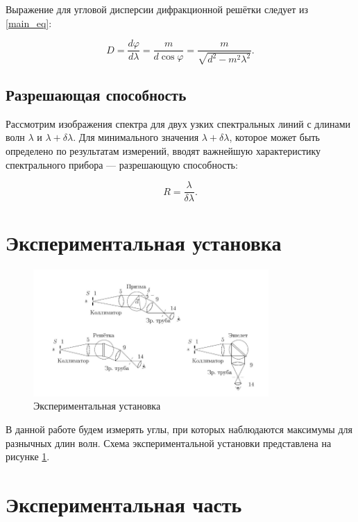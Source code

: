 \documentclass[a4paper]{article}
\begin{document}
    Выражение для угловой дисперсии дифракционной решётки следует из \eqref{main_eq}:

    \begin{equation}
        D = \frac{d\varphi}{d\lambda} = \frac{m}{d \cos \varphi}=\frac{m}{\sqrt{d^{2}-m^{2} \lambda^{2}}}.
    \end{equation}

    \subsection{Разрешающая способность}

    Рассмотрим изображения спектра для двух узких спектральных линий с длинами волн $\lambda$ и $\lambda+\delta\lambda$.
    Для минимального значения $\lambda+\delta\lambda$, которое может быть определено по результатам измерений, вводят важнейшую характеристику спектрального прибора — разрешающую способность:

    \begin{equation}
        R=\frac{\lambda}{\delta\lambda}.
        \label{razr}
    \end{equation}

\section{Экспериментальная установка}

\begin{figure}[!h]
    \centering
    \includegraphics[width=0.8\textwidth]{Ustanovka.png}
    \caption{Экспериментальная установка}
    \label{fig:ustanovka}
\end{figure}

В данной работе будем измерять углы, при которых наблюдаются максимумы для разнычных длин волн. 
Схема экспериментальной установки представлена на рисунке \ref{fig:ustanovka}.

\newpage

\section{Экспериментальная часть}
\end{document}
